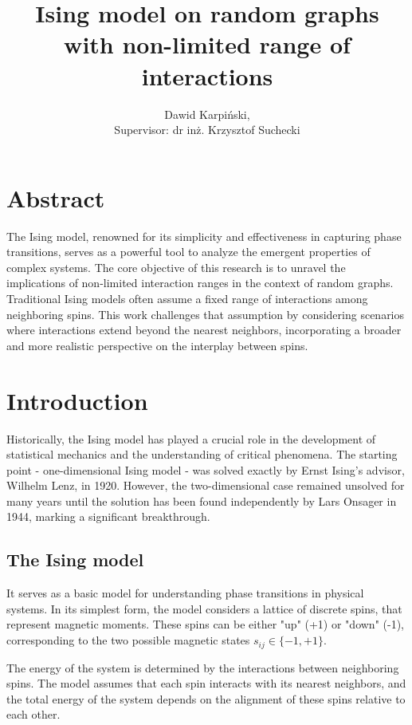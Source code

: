 \documentclass[11pt,a4paper]{article}
\begin{document}
\title{Ising model on random graphs with non-limited range of interactions}
\author{Dawid Karpiński,\\Supervisor: dr inż. Krzysztof Suchecki}
\date{}
\maketitle

\section*{Abstract}

The Ising model, renowned for its simplicity and effectiveness in capturing phase transitions, serves as a powerful tool to analyze the emergent properties of complex systems. The core objective of this research is to unravel the implications of non-limited interaction ranges in the context of random graphs. Traditional Ising models often assume a fixed range of interactions among neighboring spins. This work challenges that assumption by considering scenarios where interactions extend beyond the nearest neighbors, incorporating a broader and more realistic perspective on the interplay between spins.

\section{Introduction}

Historically, the Ising model has played a crucial role in the development of statistical mechanics and the understanding of critical phenomena. The starting point - one-dimensional Ising model - was solved exactly by Ernst Ising's advisor, Wilhelm Lenz, in 1920. However, the two-dimensional case remained unsolved for many years until the solution has been found independently by Lars Onsager in 1944, marking a significant breakthrough.


\subsection{The Ising model}

It serves as a basic model for understanding phase transitions in physical systems. In its simplest form, the model considers a lattice of discrete spins, that represent magnetic moments. These spins can be either "up" (+1) or "down" (-1), corresponding to the two possible magnetic states $s_{ij}\in\{-1, +1\}$.

The energy of the system is determined by the interactions between neighboring spins. The model assumes that each spin interacts with its nearest neighbors, and the total energy of the system depends on the alignment of these spins relative to each other.
\end{document}
